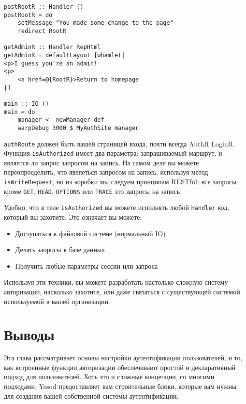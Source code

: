 \begin{lstlisting}
postRootR :: Handler ()
postRootR = do
    setMessage "You made some change to the page"
    redirect RootR

getAdminR :: Handler RepHtml
getAdminR = defaultLayout [whamlet|
<p>I guess you're an admin!
<p>
    <a href=@{RootR}>Return to homepage
|]

main :: IO ()
main = do
    manager <- newManager def
    warpDebug 3000 $ MyAuthSite manager
\end{lstlisting}

\lstinline'authRoute' должен быть вашей страницей входа, почти всегда AuthR LoginR. Функция \lstinline'isAuthorized' имеет два параметра: запрашиваемый маршрут, и является ли запрос запросом на запись. На самом деле вы можете переопроеделить, что являеться запросом на запись, используя метод \lstinline'isWriteRequest', но из коробки мы следуем принципам RESTful: все запросы кроме \lstinline'GET', \lstinline'HEAD', \lstinline'OPTIONS' или \lstinline'TRACE' это запросы на запись.

Удобно, что в теле \lstinline'isAuthorized' вы можете исполнять любой \lstinline'Handler' код, который вы захотите. Это означает вы можете:

\begin{itemize}
    \item Доступаться к файловой системе (нормальный IO)

    \item Делать запросы к базе данных

    \item Получить любые параметры сессии или запроса
\end{itemize}

Используя эти техники, вы можете разработать настолько сложную систему авторизации, насколько захотите, или даже связаться с существующей системой используемой в вашей организации.

\section{Выводы}

Эта глава рассматривает основы настройки аутентификации пользователей, и то, как встроенные функции авторизации обеспечивают простой и декларативный подход для пользователей. Хоть это и сложные концепции, со многими подходами, Yesod предоставляет вам строительные блоки, которые вам нужны для создания вашей собственной системы аутентификации.
